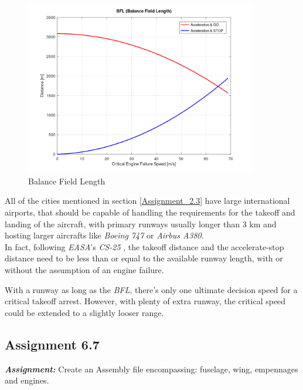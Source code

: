 \documentclass{article}
\begin{document}
\begin{figure}[h!]
    \centering
    \includegraphics[width=0.9\textwidth]{Sources/Plots_and_Pictures/BFL.png}
    \caption{Balance Field Length}
    \label{BFL}
\end{figure}

All of the cities mentioned in section \ref{Assignment_2.3} have large international airports, that should be 
capable of handling the requirements for the takeoff and landing of the aircraft, with primary runways usually longer than 3 km 
and hosting larger aircrafts like \textit{Boeing 747} or \textit{Airbus A380}. \\

In fact, following \textit{EASA}'s \textit{CS-25} \autocite{EASA_CS25}, the takeoff distance and the accelerate-stop distance
need to be less than or equal to the available runway length, with or without the assumption of an engine failure.

With a runway as long as the \textit{BFL}, there's only one ultimate decision speed for a critical takeoff arrest.
However, with plenty of extra runway, the critical speed could be extended to a slightly looser
range.

\clearpage






\subsection{Assignment 6.7\label{Assignment_6.7}}

\textbf{\textit{Assignment:}} Create an Assembly file encompassing: 
fuselage, wing, empennages and engines. \\ \\ \\ 
\end{document}
